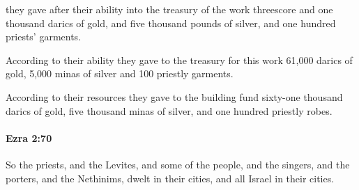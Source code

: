 			\begin{versebox}
					\item[BHS] 
					\item[LXX] 
					\item[ASV] they gave after their ability into the treasury of the work threescore and one thousand darics of gold, and five thousand pounds of silver, and one hundred priests' garments.
					\item[NIV] According to their ability they gave to the treasury for this work 61,000 darics of gold, 5,000 minas of silver and 100 priestly garments.
					\item[NRSV] According to their resources they gave to the building fund sixty-one thousand darics of gold, five thousand minas of silver, and one hundred priestly robes.
			\end{versebox}

		\paragraph{Ezra 2:70} %
			\label{EZRA-2-70}

			So the priests, and the Levites, and some of the people, and the singers, and the porters, and the Nethinims, dwelt in their cities, and all Israel in their cities.

